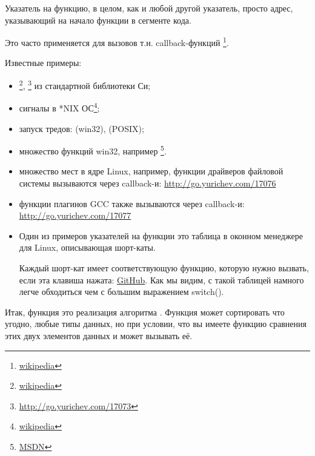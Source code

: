 \newcommand{\comp}{\TT{comp()}\xspace}
\label{sec:pointerstofunctions}

\myindex{\CLanguageElements!\Pointers}
Указатель на функцию, в целом, как и любой другой указатель, просто адрес, указывающий на начало функции 
в сегменте кода.

Это часто применяется для вызовов т.н. callback-функций \footnote{\href{http://go.yurichev.com/17071}{wikipedia}}.

Известные примеры:

\begin{itemize}
\item \qsort\footnote{\href{http://go.yurichev.com/17072}{wikipedia}},
{}\footnote{\url{http://go.yurichev.com/17073}} из стандартной библиотеки Си; 

\item сигналы в *NIX ОС\footnote{\href{http://go.yurichev.com/17074}{wikipedia}};

\item запуск тредов:  (win32),  (POSIX);

\item множество функций win32, например \footnote{\href{http://go.yurichev.com/17075}{MSDN}}.

\item множество мест в ядре Linux, например, функции драйверов файловой системы вызываются
через callback-и: 
\url{http://go.yurichev.com/17076}

\item функции плагинов GCC также вызываются через callback-и: 
\url{http://go.yurichev.com/17077}

\item Один из примеров указателей на функции это таблица в оконном менеджере  для Linux, описывающая шорт-каты.

Каждый шорт-кат имеет соответствующую функцию, которую нужно вызвать, если эта клавиша нажата: \href{http://go.yurichev.com/17078}{GitHub}.
Как мы видим, с такой таблицей намного легче обходиться чем с большим выражением switch().

\end{itemize}

Итак, функция \qsort это реализация алгоритма . 
Функция может сортировать что угодно, 
любые типы данных, но при условии, что вы имеете функцию сравнения этих двух элементов данных и 
\qsort может вызывать её.

